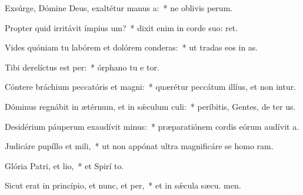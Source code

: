 \item Exsúrge, Dómine Deus, exaltétur manus a:~* ne oblivis perum.
\item Propter quid irritávit ímpius um?~* dixit enim in corde suo:  ret.
\item Vides quóniam tu labórem et dolórem conderas:~* ut tradas eos in  as.
\item Tibi derelíctus est per:~* órphano tu e tor.
\item Cóntere bráchium peccatóris et magni:~* quærétur peccátum illíus, et non intur.
\item Dóminus regnábit in ætérnum, et in sǽculum culi:~* períbitis, Gentes, de ter us.
\item Desidérium páuperum exaudívit minus:~* præparatiónem cordis eórum audívit  a.
\item Judicáre pupíllo et mili,~* ut non appónat ultra magnificáre se homo  ram.
\item Glória Patri, et lio,~* et Spirí to.
\item Sicut erat in princípio, et nunc, et per,~* et in sǽcula sæcu. men.
